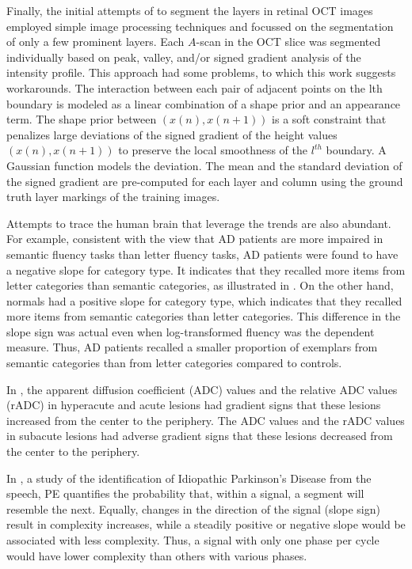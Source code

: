 \documentclass[11pt]{book}
\begin{document}
Finally, the initial attempts of \cite{chakravarty2018supervised}
to segment the layers in retinal OCT images employed simple image
processing techniques and focussed on the segmentation of only a few
prominent layers. Each $A$-scan in the OCT slice was segmented individually
based on peak, valley, and/or signed gradient analysis of the intensity
profile. This approach had some problems, to which this work suggests
workarounds. The interaction between each pair of adjacent points
on the lth boundary is modeled as a linear combination of a shape
prior and an appearance term. The shape prior between $\left(x\left(n\right),x\left(n+1\right)\right)$
is a soft constraint that penalizes large deviations of the signed
gradient of the height values $\left(x\left(n\right),x\left(n+1\right)\right)$
to preserve the local smoothness of the $l^{th}$ boundary. A Gaussian
function models the deviation. The mean and the standard deviation
of the signed gradient are pre-computed for each layer and column
using the ground truth layer markings of the training images.

Attempts to trace the human brain that leverage the trends are also
abundant. For example, consistent with the view that AD patients are
more impaired in semantic fluency tasks than letter fluency tasks,
AD patients were found to have a negative slope for category type.
It indicates that they recalled more items from letter categories
than semantic categories, as illustrated in \cite{diaz2004category}.
On the other hand, normals had a positive slope for category type,
which indicates that they recalled more items from semantic categories
than letter categories. This difference in the slope sign was actual
even when log-transformed fluency was the dependent measure. Thus,
AD patients recalled a smaller proportion of exemplars from semantic
categories than from letter categories compared to controls. 

In \cite{shen2011use}, the apparent diffusion coefficient (ADC) values and the relative ADC values (rADC) in hyperacute
and acute lesions had gradient signs that these lesions increased
from the center to the periphery. The ADC values and the rADC values
in subacute lesions had adverse gradient signs that these lesions
decreased from the center to the periphery. 

In \cite{godino2017towards}, a study of the identification of Idiopathic Parkinson’s Disease
from the speech,
PE quantifies the probability that, within a signal, a segment will
resemble the next. Equally, changes in the direction of the signal
(slope sign) result in complexity increases, while a steadily positive
or negative slope would be associated with less complexity. Thus,
a signal with only one phase per cycle would have lower complexity
than others with various phases. 
\end{document}
